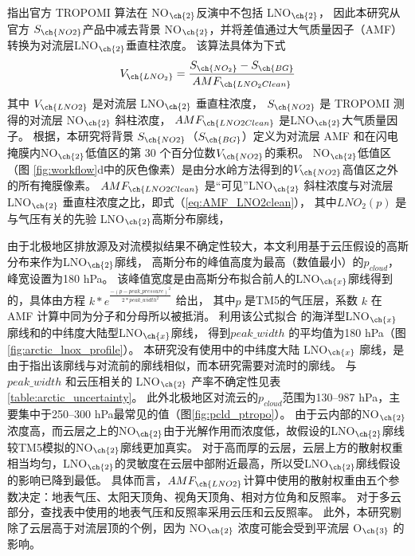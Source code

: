 \citet{Zhang.2022a}指出官方 TROPOMI 算法在 NO$_{\ch{2}}$反演中不包括 LNO$_{\ch{2}}$，
因此本研究从官方 $S_{\ch{NO2}}$产品中减去背景 NO$_{\ch{2}}$，并将差值通过大气质量因子（AMF）转换为对流层LNO$_{\ch{2}}$垂直柱浓度。
该算法具体为下式
\begin{equation} \label{eq:arctic_LNO2}
V_{\ch{LNO_2}} = \frac{S_{\ch{NO_2}} - S_{\ch{BG}}}{AMF_{\ch{LNO_2Clean}}}
\end{equation}
其中 $V_{\ch{LNO2}}$ 是对流层 LNO$_{\ch{2}}$ 垂直柱浓度，
$S_{\ch{NO2}}$ 是 TROPOMI 测得的对流层 NO$_{\ch{2}}$ 斜柱浓度，
$AMF_{\ch{LNO2Clean}}$ 是LNO$_{\ch{2}}$大气质量因子。
根据\citet{Allen.2021a}，本研究将背景 $S_{\ch{NO2}}$（$S_{\ch{BG}}$）定义为对流层 AMF 和在闪电掩膜内NO$_{\ch{2}}$低值区的第 30 个百分位数$V_{\ch{NO2}}$的乘积。
NO$_{\ch{2}}$低值区（图 \ref{fig:workflow}d中的灰色像素）是由分水岭方法得到的$V_{\ch{NO2}}$高值区之外的所有掩膜像素。
$AMF_{\ch{LNO2Clean}}$ 是“可见”LNO$_{\ch{2}}$ 斜柱浓度与对流层 LNO$_{\ch{2}}$ 垂直柱浓度之比，即式（\ref{eq:AMF_LNO2clean}），
其中$LNO_2(p)$ 是与气压有关的先验 LNO$_{\ch{2}}$高斯分布廓线，

由于北极地区排放源及对流模拟结果不确定性较大，本文利用基于云压假设的高斯分布来作为LNO$_{\ch{2}}$廓线，
高斯分布的峰值高度为最高（数值最小）的$p_{cloud}$，峰宽设置为180 hPa。
该峰值宽度是由高斯分布拟合前人的LNO$_{\ch{x}}$廓线得到的，具体由方程 $k*e^\frac{{-{(p - peak\_pressure)}^2}}{2*peak\_width^{2}}$ 给出，
其中$p$ 是TM5的气压层，系数 $k$ 在 AMF 计算中同为分子和分母所以被抵消。
利用该公式拟合 \citet{Ott.2010} 的海洋型LNO$_{\ch{x}}$廓线和\citet{Luo.2017}的中纬度大陆型LNO$_{\ch{x}}$廓线，
得到$peak\_width$ 的平均值为180 hPa（图\ref{fig:arctic_lnox_profile}）。
本研究没有使用\citet{Ott.2010}中的中纬度大陆 LNO$_{\ch{x}}$ 廓线，是由于\citet{Luo.2017}指出该廓线与对流前的廓线相似，而本研究需要对流时的廓线。
与 $peak\_width$ 和云压相关的 LNO$_{\ch{2}}$ 产率不确定性见表\ref{table:arctic_uncertainty}。
此外北极地区对流云的$p_{cloud}$范围为130--987 hPa，主要集中于250--300 hPa最常见的值（图\ref{fig:pcld_ptropo}）。
由于云内部的NO$_{\ch{2}}$浓度高，而云层之上的NO$_{\ch{2}}$由于光解作用而浓度低，故假设的LNO$_{\ch{2}}$廓线较TM5模拟的NO$_{\ch{2}}$廓线更加真实\citep{Beirle.2009}。
对于高而厚的云层，云层上方的散射权重相当均匀，LNO$_{\ch{2}}$的灵敏度在云层中部附近最高，所以受LNO$_{\ch{2}}$廓线假设的影响已降到最低\citep{Laughner.2017}。
具体而言，$AMF_{\ch{LNO2}}$计算中使用的散射权重由五个参数决定：地表气压、太阳天顶角、视角天顶角、相对方位角和反照率。
对于多云部分，查找表中使用的地表气压和反照率采用云压和云反照率。
此外，本研究剔除了云层高于对流层顶的个例，因为 NO$_{\ch{2}}$ 浓度可能会受到平流层 O$_{\ch{3}}$ 的影响\citep{Frey.2015a,Zhang.2022a}。

